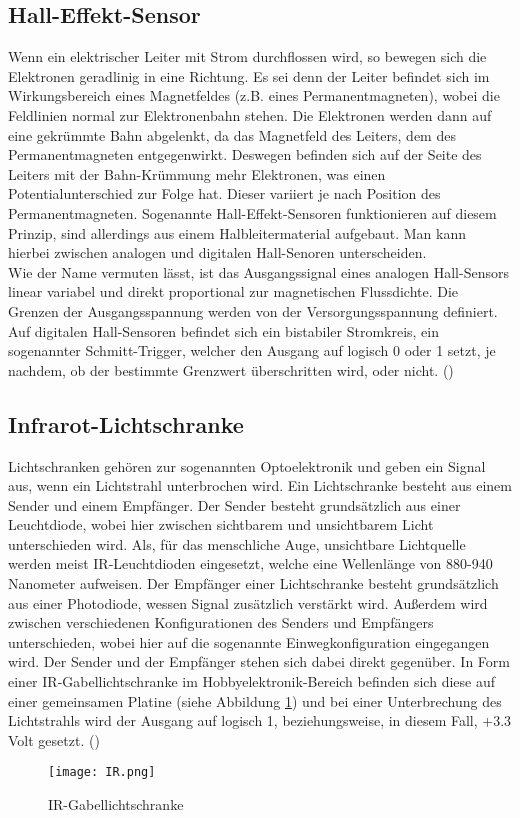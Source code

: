\subsection{Hall-Effekt-Sensor}
\label{subsec:tHall}
Wenn ein elektrischer Leiter mit Strom durchflossen wird, so bewegen sich die Elektronen geradlinig in eine Richtung. Es sei denn der Leiter befindet sich im Wirkungsbereich eines Magnetfeldes (z.B. eines Permanentmagneten), wobei die Feldlinien normal zur Elektronenbahn stehen. Die Elektronen werden dann auf eine gekrümmte Bahn abgelenkt, da das Magnetfeld des Leiters, dem des Permanentmagneten entgegenwirkt. Deswegen befinden sich auf der Seite des Leiters mit der Bahn-Krümmung mehr Elektronen, was einen Potentialunterschied zur Folge hat. Dieser variiert je nach Position des Permanentmagneten. Sogenannte Hall-Effekt-Sensoren funktionieren auf diesem Prinzip, sind allerdings aus einem Halbleitermaterial aufgebaut. Man kann hierbei zwischen analogen und digitalen Hall-Senoren unterscheiden.\\
Wie der Name vermuten lässt, ist das Ausgangssignal eines analogen Hall-Sensors linear variabel und direkt proportional zur magnetischen Flussdichte. Die Grenzen der Ausgangsspannung werden von der Versorgungsspannung definiert. Auf digitalen Hall-Sensoren befindet sich ein bistabiler Stromkreis, ein sogenannter Schmitt-Trigger, welcher den Ausgang auf logisch 0 oder 1 setzt, je nachdem, ob der bestimmte Grenzwert überschritten wird, oder nicht. (\cite{rsHALL})

\subsection{Infrarot-Lichtschranke}
\label{subsec:tIR}
Lichtschranken gehören zur sogenannten Optoelektronik und geben ein Signal aus, wenn ein Lichtstrahl unterbrochen wird. Ein Lichtschranke besteht aus einem Sender und einem Empfänger. Der Sender besteht grundsätzlich aus einer Leuchtdiode, wobei hier zwischen sichtbarem und unsichtbarem Licht unterschieden wird. Als, für das menschliche Auge, unsichtbare Lichtquelle werden meist \ac{IR}-Leuchtdioden eingesetzt, welche eine Wellenlänge von 880-940 Nanometer aufweisen. Der Empfänger einer Lichtschranke besteht grundsätzlich aus einer Photodiode, wessen Signal zusätzlich verstärkt wird. Außerdem wird zwischen verschiedenen Konfigurationen des Senders und Empfängers unterschieden, wobei hier auf die sogenannte Einwegkonfiguration eingegangen wird. Der Sender und der Empfänger stehen sich dabei direkt gegenüber. In Form einer \ac{IR}-Gabellichtschranke im Hobbyelektronik-Bereich befinden sich diese auf einer gemeinsamen Platine (siehe Abbildung \ref{fig:IR}) und bei einer Unterbrechung des Lichtstrahls wird der Ausgang auf logisch 1, beziehungsweise, in diesem Fall, +3.3 Volt gesetzt.
(\cite{huschke2000lichtschranken})
\begin{figure}[h]
\centering
\texttt{[image: IR.png]}
\caption{IR-Gabellichtschranke}
\label{fig:IR}
\end{figure}

